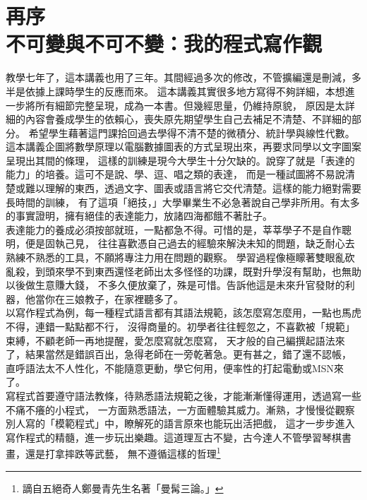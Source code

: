 \chapter*{再序\\ 不可變與不可不變：我的程式寫作觀}
教學七年了，這本講義也用了三年。其間經過多次的修改，不管擴編還是刪減，多半是依據上課時學生的反應而來。
這本講義其實很多地方寫得不夠詳細，本想進一步將所有細節完整呈現，成為一本書。但幾經思量，仍維持原貌，
原因是太詳細的內容會養成學生的依賴心，喪失原先期望學生自己去補足不清楚、不詳細的部分。
希望學生藉著這門課拾回過去學得不清不楚的微積分、統計學與線性代數。\\

這本講義企圖將數學原理以電腦數據圖表的方式呈現出來，再要求同學以文字圖案呈現出其間的條理，
這樣的訓練是現今大學生十分欠缺的。說穿了就是「表達的能力」的培養。這可不是說、學、逗、唱之類的表達，
而是一種試圖將不易說清楚或難以理解的東西，透過文字、圖表或語言將它交代清楚。這樣的能力絕對需要長時間的訓練，
有了這項「絕技，」大學畢業生不必急著說自己學非所用。有太多的事實證明，擁有絕佳的表達能力，放諸四海都餓不著肚子。\\

表達能力的養成必須按部就班，一點都急不得。可惜的是，莘莘學子不是自作聰明，便是固執己見，
往往喜歡憑自己過去的經驗來解決未知的問題，缺乏耐心去熟練不熟悉的工具，不願將專注力用在問題的觀察。
學習過程像極矇著雙眼亂砍亂殺，到頭來學不到東西還怪老師出太多怪怪的功課，既對升學沒有幫助，也無助以後做生意賺大錢，
不多久便放棄了，殊是可惜。告訴他這是未來升官發財的利器，他當你在三娘教子，在家裡聽多了。\\

以寫作程式為例，每一種程式語言都有其語法規範，該怎麼寫怎麼用，一點也馬虎不得，連錯一點點都不行，
沒得商量的。初學者往往輕忽之，不喜歡被「規範」束縛，不顧老師一再地提醒，愛怎麼寫就怎麼寫，
天才般的自己編撰起語法來了，結果當然是錯誤百出，急得老師在一旁乾著急。更有甚之，錯了還不認帳，
直呼語法太不人性化，不能隨意更動，學它何用，便率性的打起電動或MSN來了。\\

寫程式首要遵守語法教條，待熟悉語法規範之後，才能漸漸懂得運用，透過寫一些不痛不癢的小程式，
一方面熟悉語法，一方面體驗其威力。漸熟，才慢慢從觀察別人寫的「模範程式」中，瞭解死的語言原來也能玩出活把戲，
這才一步步進入寫作程式的精髓，進一步玩出樂趣。這道理亙古不變，古今達人不管學習琴棋書畫，還是打拿摔跌等武藝，
無不遵循這樣的哲理\footnote{謫自五絕奇人鄭曼青先生名著「曼髯三論。」}\\

